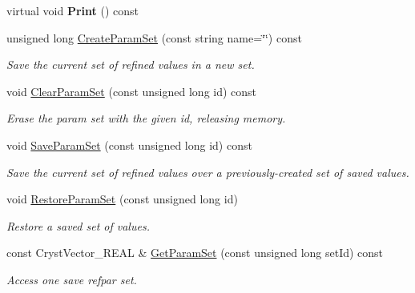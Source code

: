 \begin{DoxyCompactItemize}
\item 
\mbox{\label{class_obj_cryst_1_1_refinable_obj_a4b6cfeb6724ac6538eca4c6767fbc55c}} 
virtual void {\bfseries Print} () const
\item 
unsigned long \mbox{\hyperlink{class_obj_cryst_1_1_refinable_obj_abb7ba59ef7cad325753587b484e60bfe}{Create\+Param\+Set}} (const string name=\char`\"{}\char`\"{}) const
\begin{DoxyCompactList}\small\item\em Save the current set of refined values in a new set. \end{DoxyCompactList}\item 
\mbox{\label{class_obj_cryst_1_1_refinable_obj_a9a544bbd15c15b1e8858f5c765b7da79}} 
void \mbox{\hyperlink{class_obj_cryst_1_1_refinable_obj_a9a544bbd15c15b1e8858f5c765b7da79}{Clear\+Param\+Set}} (const unsigned long id) const
\begin{DoxyCompactList}\small\item\em Erase the param set with the given id, releasing memory. \end{DoxyCompactList}\item 
void \mbox{\hyperlink{class_obj_cryst_1_1_refinable_obj_a515a81780181269eb232278f7511b2bb}{Save\+Param\+Set}} (const unsigned long id) const
\begin{DoxyCompactList}\small\item\em Save the current set of refined values over a previously-\/created set of saved values. \end{DoxyCompactList}\item 
void \mbox{\hyperlink{class_obj_cryst_1_1_refinable_obj_a057437fe6759b589906d8a16f9732e22}{Restore\+Param\+Set}} (const unsigned long id)
\begin{DoxyCompactList}\small\item\em Restore a saved set of values. \end{DoxyCompactList}\item 
const Cryst\+Vector\+\_\+\+R\+E\+AL \& \mbox{\hyperlink{class_obj_cryst_1_1_refinable_obj_a8c542c9935105d88c38cc83b7b4dc506}{Get\+Param\+Set}} (const unsigned long set\+Id) const
\begin{DoxyCompactList}\small\item\em Access one save refpar set. \end{DoxyCompactList}\item 

\end{DoxyCompactItemize}
